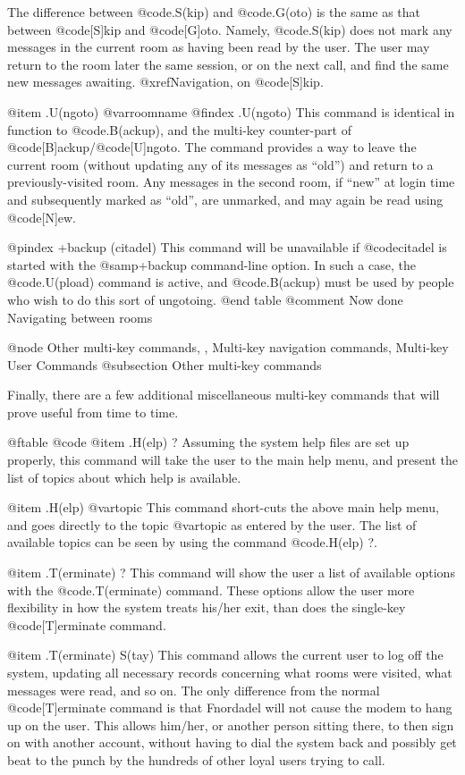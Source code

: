 The difference between @code{.S(kip)} and @code{.G(oto)} is the same as that
between @code{[S]kip} and @code{[G]oto}.  Namely, @code{.S(kip)} does not mark any messages
in the current room as having been read by the user.  The user may
return to the room later the same session, or on the next call, and
find the same new messages awaiting.  @xref{Navigation}, on @code{[S]kip}.

@item .U(ngoto) @var{roomname}
@findex .U(ngoto)
This command is identical in function to @code{.B(ackup)}, and the
multi-key counter-part of @code{[B]ackup}/@code{[U]ngoto}.  The command provides a
way to leave the current room (without updating any of its messages as
``old'') and return to a previously-visited room.  Any messages in the
second room, if ``new'' at login time and subsequently marked as ``old'',
are unmarked, and may again be read using @code{[N]ew}.

@pindex +backup (citadel)
This command will be unavailable if @code{citadel} is started
with the @samp{+backup} command-line option.  In such a case, the @code{.U(pload)}
command is active, and @code{.B(ackup)} must be used by people who wish to
do this sort of ungotoing.
@end table
@comment Now done Navigating between rooms

@node Other multi-key commands,  , Multi-key navigation commands, Multi-key User Commands
@subsection Other multi-key commands

Finally, there are a few additional miscellaneous multi-key commands that
will prove useful from time to time.

@ftable @code
@item .H(elp) ?
Assuming the system help files are set up properly, this
command will take the user to the main help menu, and present the list
of topics about which help is available.

@item .H(elp) @var{topic}
This command short-cuts the above main help menu, and goes
directly to the topic @var{topic} as entered by the user.  The list of
available topics can be seen by using the command @code{.H(elp) ?}.

@item .T(erminate) ?
This command will show the user a list of available options
with the @code{.T(erminate)} command.  These options allow the user more
flexibility in how the system treats his/her exit, than does the
single-key @code{[T]erminate} command.

@item .T(erminate) S(tay)
This command allows the current user to log off the system,
updating all necessary records concerning what rooms were visited,
what messages were read, and so on.  The only difference from the
normal @code{[T]erminate} command is that Fnordadel will not cause the modem
to hang up on the user.  This allows him/her, or another person sitting
there, to then sign on with another account, without having to dial
the system back and possibly get beat to the punch by the hundreds of
other loyal users trying to call.

